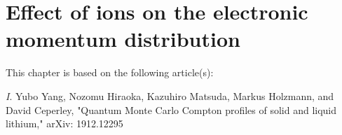 \chapter{Effect of ions on the electronic momentum distribution}
This chapter is based on the following article(s):

\textit{I}. Yubo Yang, Nozomu Hiraoka, Kazuhiro Matsuda, Markus Holzmann, and David Ceperley, "Quantum Monte Carlo Compton profiles of solid and liquid lithium," arXiv: 1912.12295


